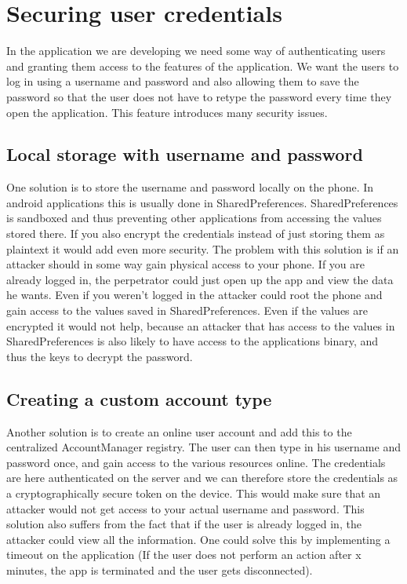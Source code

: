 \section{Securing user credentials}
In the application we are developing we need some way of authenticating users and granting them access to the features of the application. We want the users to log in using a username and password and also allowing them to save the password so that the user does not have to retype the password every time they open the application. This feature introduces many security issues. 

\subsection{Local storage with username and password}
One solution is to store the username and password locally on the phone. In android applications this is usually done in SharedPreferences. SharedPreferences is sandboxed and thus preventing other applications from accessing the values stored there. If you also encrypt the credentials instead of just storing them as plaintext it would add even more security. 
\newline
\newline
The problem with this solution is if an attacker should in some way gain physical access to your phone. If you are already logged in, the perpetrator could just open up the app and view the data he wants. Even if you weren’t logged in the attacker could root the phone and gain access to the values saved in SharedPreferences. Even if the values are encrypted it would not help, because an attacker that has access to the values in SharedPreferences is also likely to have access to the applications binary, and thus the keys to decrypt the password.

\subsection{Creating a custom account type}
Another solution is to create an online user account and add this to the centralized AccountManager registry. The user can then type in his username and password once, and gain access to the various resources online. The credentials are here authenticated on the server and we can therefore store the credentials as a cryptographically secure token on the device. This would make sure that an attacker would not get access to your actual username and password. 
\newline
\newline
This solution also suffers from the fact that if the user is already logged in, the attacker could view all the information. One could solve this by implementing a timeout on the application (If the user does not perform an action after x minutes, the app is terminated and the user gets disconnected).

